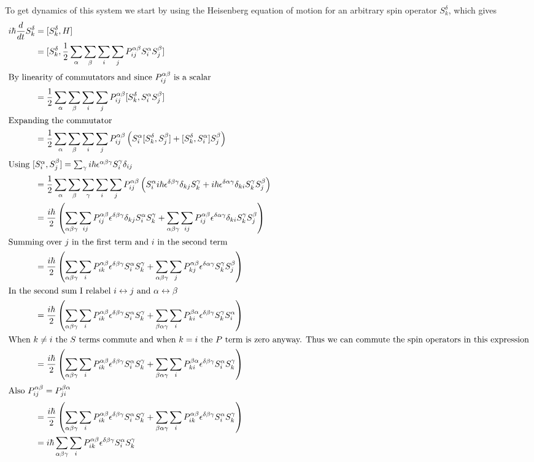 \documentclass{article}
\begin{document}
To get dynamics of this system we start by using the Heisenberg equation of motion for an arbitrary spin operator $S^\delta_k$, which gives
\begin{align}
i\hbar \frac{d}{d t} S^\delta_k &= [S_k^\delta,H]\\
&= [S_k^\delta,\dfrac{1}{2}\sum_\alpha\sum_\beta\sum_i\sum_j P_{ij}^{\alpha\beta} S_i^\alpha S_j^\beta]\\
\intertext{By linearity of commutators and since $P^{\alpha\beta}_{ij}$ is a scalar}
&= \frac{1}{2}\sum_\alpha \sum_\beta \sum_i \sum_j P^{\alpha\beta}_{ij}[S^\delta_k,S^\alpha_iS^\beta_j]\\
\intertext{Expanding the commutator}
&= \dfrac{1}{2}\sum_\alpha \sum_\beta \sum_i \sum_j P^{\alpha\beta}_{ij} \left(S^\alpha_i[S^\delta_k,S^\beta_j]+[S^\delta_k,S^\alpha_i]S^\beta_j\right)\\
\intertext{Using $[S^\alpha_i,S^\beta_j]=\sum_\gamma i\hbar \epsilon^{\alpha\beta\gamma}S^\gamma_i\delta_{ij}$}
&= \dfrac{1}{2}\sum_\alpha \sum_\beta \sum_\gamma \sum_i \sum_j P^{\alpha\beta}_{ij} \left(S^\alpha_i i\hbar\epsilon^{\delta\beta\gamma}\delta_{kj}S^\gamma_k+i\hbar\epsilon^{\delta\alpha\gamma}\delta_{ki}S^\gamma_kS^\beta_j\right)\\
&= \dfrac{i\hbar}{2}\left(
\sum_{\alpha\beta\gamma} \sum_{ij} P^{\alpha\beta}_{ij}\epsilon^{\delta\beta\gamma}\delta_{kj}S^\alpha_iS^\gamma_k
+\sum_{\alpha\beta\gamma} \sum_{ij} P^{\alpha\beta}_{ij}\epsilon^{\delta\alpha\gamma}\delta_{ki}S^\gamma_kS^\beta_j
\right)\\
\intertext{Summing over $j$ in the first term and $i$ in the second term}
&= \dfrac{i\hbar}{2}\left(
\sum_{\alpha\beta\gamma} \sum_{i} P^{\alpha\beta}_{ik}\epsilon^{\delta\beta\gamma}S^\alpha_iS^\gamma_k
+ \sum_{\alpha\beta\gamma} \sum_{j} P^{\alpha\beta}_{kj}\epsilon^{\delta\alpha\gamma}S^\gamma_kS^\beta_j
\right)\\
\intertext{In the second sum I relabel $i \leftrightarrow j$ and $\alpha \leftrightarrow \beta$}
&= \dfrac{i\hbar}{2}\left(
\sum_{\alpha\beta\gamma} \sum_{i} P^{\alpha\beta}_{ik}\epsilon^{\delta\beta\gamma}S^\alpha_iS^\gamma_k
+ \sum_{\beta\alpha\gamma} \sum_{i} P^{\beta\alpha}_{ki}\epsilon^{\delta\beta\gamma}S^\gamma_kS^\alpha_i
\right)\\
\intertext{When $k\neq i$ the $S$ terms commute and when $k=i$ the $P$ term is zero anyway. Thus we can commute the spin operators in this expression}
&= \dfrac{i\hbar}{2}\left(
\sum_{\alpha\beta\gamma} \sum_{i} P^{\alpha\beta}_{ik}\epsilon^{\delta\beta\gamma}S^\alpha_iS^\gamma_k
+ \sum_{\beta\alpha\gamma} \sum_{i} P^{\beta\alpha}_{ki}\epsilon^{\delta\beta\gamma}S^\alpha_iS^\gamma_k
\right)\\
\intertext{Also $P_{ij}^{\alpha\beta}=P_{ji}^{\beta\alpha}$}
&= \dfrac{i\hbar}{2}\left(
\sum_{\alpha\beta\gamma} \sum_{i} P^{\alpha\beta}_{ik}\epsilon^{\delta\beta\gamma}S^\alpha_iS^\gamma_k
+ \sum_{\beta\alpha\gamma} \sum_{i} P^{\alpha\beta}_{ik}\epsilon^{\delta\beta\gamma}S^\alpha_iS^\gamma_k
\right)\\
&= i\hbar\sum_{\alpha\beta\gamma} \sum_{i} P^{\alpha\beta}_{ik}\epsilon^{\delta\beta\gamma}S^\alpha_iS^\gamma_k
\end{align}
\end{document}
